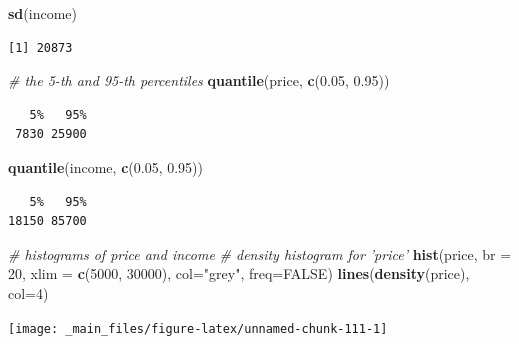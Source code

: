 \documentclass[
]{book}
\newenvironment{Shaded}{\begin{snugshade}}{\end{snugshade}}
\newcommand{\CommentTok}[1]{\textcolor[rgb]{0.56,0.35,0.01}{\textit{#1}}}
\newcommand{\DataTypeTok}[1]{\textcolor[rgb]{0.13,0.29,0.53}{#1}}
\newcommand{\DecValTok}[1]{\textcolor[rgb]{0.00,0.00,0.81}{#1}}
\newcommand{\FloatTok}[1]{\textcolor[rgb]{0.00,0.00,0.81}{#1}}
\newcommand{\KeywordTok}[1]{\textcolor[rgb]{0.13,0.29,0.53}{\textbf{#1}}}
\newcommand{\NormalTok}[1]{#1}
\newcommand{\OtherTok}[1]{\textcolor[rgb]{0.56,0.35,0.01}{#1}}
\newcommand{\StringTok}[1]{\textcolor[rgb]{0.31,0.60,0.02}{#1}}
\begin{document}
\begin{Shaded}
\begin{Highlighting}[]
\KeywordTok{sd}\NormalTok{(income)}
\end{Highlighting}
\end{Shaded}

\begin{verbatim}
[1] 20873
\end{verbatim}

\begin{Shaded}
\begin{Highlighting}[]
\CommentTok{# the 5-th and 95-th percentiles}
\KeywordTok{quantile}\NormalTok{(price, }\KeywordTok{c}\NormalTok{(}\FloatTok{0.05}\NormalTok{, }\FloatTok{0.95}\NormalTok{))}
\end{Highlighting}
\end{Shaded}

\begin{verbatim}
   5%   95% 
 7830 25900 
\end{verbatim}

\begin{Shaded}
\begin{Highlighting}[]
\KeywordTok{quantile}\NormalTok{(income, }\KeywordTok{c}\NormalTok{(}\FloatTok{0.05}\NormalTok{, }\FloatTok{0.95}\NormalTok{))}
\end{Highlighting}
\end{Shaded}

\begin{verbatim}
   5%   95% 
18150 85700 
\end{verbatim}

\begin{Shaded}
\begin{Highlighting}[]
\CommentTok{# histograms of price and income}
\CommentTok{# density histogram for 'price'}
\KeywordTok{hist}\NormalTok{(price, }\DataTypeTok{br =} \DecValTok{20}\NormalTok{, }\DataTypeTok{xlim =} \KeywordTok{c}\NormalTok{(}\DecValTok{5000}\NormalTok{, }\DecValTok{30000}\NormalTok{), }\DataTypeTok{col=}\StringTok{"grey"}\NormalTok{, }\DataTypeTok{freq=}\OtherTok{FALSE}\NormalTok{)}
\KeywordTok{lines}\NormalTok{(}\KeywordTok{density}\NormalTok{(price), }\DataTypeTok{col=}\DecValTok{4}\NormalTok{)}
\end{Highlighting}
\end{Shaded}

\begin{center}\texttt{[image: \_main\_files/figure-latex/unnamed-chunk-111-1]} \end{center}
\end{document}
